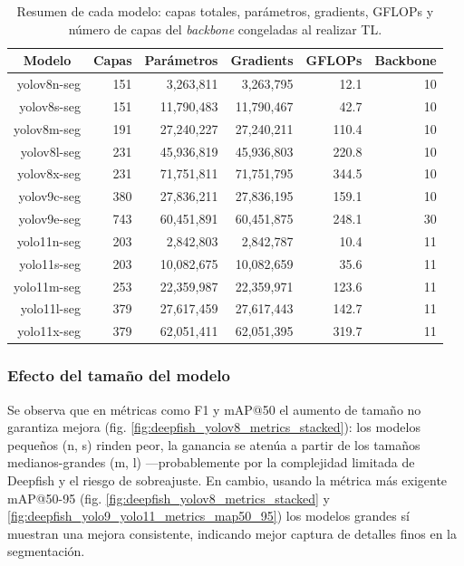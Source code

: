 \begin{table}[htbp]
\centering
\caption[Sumario de modelos YOLO a entrenar]{Resumen de cada modelo: capas totales, parámetros, gradients, GFLOPs y número de capas del \textit{backbone} congeladas al realizar TL.}
\label{tab:models_summary_freeze}
\begin{tabular}{|r|r|r|r|r|r|}
\hline
\multicolumn{1}{|c|}{\textbf{Modelo}} & \multicolumn{1}{c|}{\textbf{Capas}} & \multicolumn{1}{c|}{\textbf{Parámetros}} & \multicolumn{1}{c|}{\textbf{Gradients}} & \multicolumn{1}{c|}{\textbf{GFLOPs}} & \multicolumn{1}{c|}{\textbf{Backbone}} \\ \hline
yolov8n-seg & 151 & 3,263,811 & 3,263,795 & 12.1 & 10 \\ \hline
yolov8s-seg & 151 & 11,790,483 & 11,790,467 & 42.7 & 10 \\ \hline
yolov8m-seg & 191 & 27,240,227 & 27,240,211 & 110.4 & 10 \\ \hline
yolov8l-seg & 231 & 45,936,819 & 45,936,803 & 220.8 & 10 \\ \hline
yolov8x-seg & 231 & 71,751,811 & 71,751,795 & 344.5 & 10 \\ \hline
yolov9c-seg & 380 & 27,836,211 & 27,836,195 & 159.1 & 10 \\ \hline
yolov9e-seg & 743 & 60,451,891 & 60,451,875 & 248.1 & 30 \\ \hline
yolo11n-seg & 203 & 2,842,803 & 2,842,787 & 10.4 & 11 \\ \hline
yolo11s-seg & 203 & 10,082,675 & 10,082,659 & 35.6 & 11 \\ \hline
yolo11m-seg & 253 & 22,359,987 & 22,359,971 & 123.6 & 11 \\ \hline
yolo11l-seg & 379 & 27,617,459 & 27,617,443 & 142.7 & 11 \\ \hline
yolo11x-seg & 379 & 62,051,411 & 62,051,395 & 319.7 & 11 \\ \hline
\end{tabular}
\end{table}

\subsubsection{Efecto del tamaño del modelo}
Se observa que en métricas como F1 y mAP@50 el aumento de tamaño no garantiza mejora (fig. \ref{fig:deepfish_yolov8_metrics_stacked}): los modelos pequeños (n, s) rinden peor, la ganancia se atenúa a partir de los tamaños medianos-grandes (m, l) ---probablemente por la complejidad limitada de Deepfish y el riesgo de sobreajuste. En cambio, usando la métrica más exigente mAP@50-95 (fig. \ref{fig:deepfish_yolov8_metrics_stacked} y \ref{fig:deepfish_yolo9_yolo11_metrics_map50_95}) los modelos grandes sí muestran una mejora consistente, indicando mejor captura de detalles finos en la segmentación.

